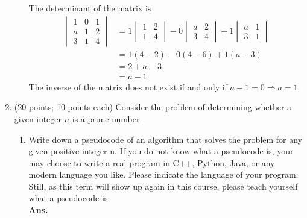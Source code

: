 \documentclass[14pt]{article}
\begin{document}
\begin{enumerate}
\begin{enumerate}
                    The determinant of the matrix is
                    \begin{align*}
                        \begin{vmatrix}
                            1 & 0 & 1 \\
                            a & 1 & 2 \\
                            3 & 1 & 4
                        \end{vmatrix}
                         & =
                        1\begin{vmatrix}
                             1 & 2 \\
                             1 & 4
                         \end{vmatrix} -
                        0\begin{vmatrix}
                             a & 2 \\
                             3 & 4
                         \end{vmatrix} +
                        1\begin{vmatrix}
                             a & 1 \\
                             3 & 1
                         \end{vmatrix}               \\
                         & = 1(4-2) - 0(4-6) + 1(a-3) \\
                         & = 2 + a - 3                \\
                         & = a - 1
                    \end{align*}
                    The inverse of the matrix does not exist if and only if $a - 1 = 0 \Rightarrow a = 1$.
          \end{enumerate}
    \item (20 points; 10 points each) Consider the problem of determining whether a given integer $n$ is a prime number.
          \begin{enumerate}
              \item Write down a pseudocode of an algorithm that solves the problem for any given positive integer n. If you do not know what a pseudocode is, your may choose to write a real program in C++, Python, Java, or any modern language you like. Please indicate the language of your program. Still, as this term will show up again in this course, please teach yourself what a pseudocode is.\\
                    \textbf{Ans.}

\end{enumerate}
\end{enumerate}
\end{document}
